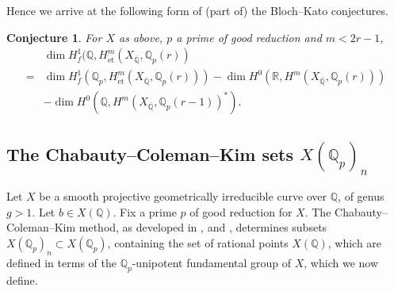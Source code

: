 \documentclass[11pt]{amsart}
\def\R{\mathbb R}
\def\Q{\mathbb Q}
\theoremstyle{plain}
\newtheorem{conjecture}{Conjecture}
\theoremstyle{definition}
\newcommand{\et}{\mathrm{\acute{e}t}}
\begin{document}
Hence we arrive at the following form of (part of) the Bloch--Kato conjectures.
\begin{conjecture}
For $X$ as above, $p$ a prime of good reduction and $m< 2r-1$,
\begin{align*}
& \dim H^1 _f (\Q ,H^m _{\et }(X_{\overline{\Q }},\Q _p (r)) \\
= & \dim H^1 _f (\Q _p ,H^m _{\et }(X_{\overline{\Q }},\Q _p (r)))- \dim H^0 (\R ,H^m (X_{\overline{\Q }},\Q _p (r))) \\
& -\dim H^0 (\Q ,H^m (X_{\overline{\Q }},\Q _p (r-1))^* ).
\end{align*}
\end{conjecture}
\subsection{The Chabauty--Coleman--Kim sets $X(\Q _p )_n $}

Let $X$ be a smooth projective geometrically irreducible curve over $\Q $, of genus $g>1$. Let $b\in X(\Q )$. Fix a prime $p$ of good reduction for $X$. The Chabauty--Coleman--Kim method, as developed in \cite{kim:chabauty}, \cite{kim2008component} and \cite{kim:siegel}, determines subsets $X(\Q _p )_n \subset X(\Q _p )$, containing the set of rational points $X(\Q )$, which are defined in terms of the $\Q _p $-unipotent fundamental group of $X$, which we now define.
\end{document}
